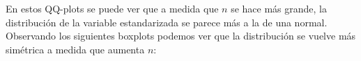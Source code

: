 \documentclass[a4paper]{article}
\begin{document}
	En estos QQ-plots se puede ver que a medida que $n$ se hace m\'as grande, la distribuci\'on de la variable estandarizada se parece m\'as a la de una normal.
	Observando los siguientes boxplots podemos ver que la distribuci\'on se vuelve m\'as sim\'etrica a medida que aumenta $n$:
	
	\begin{figure}[H]
		\centering
		\hfill
	\end{figure}
	
\end{document}
